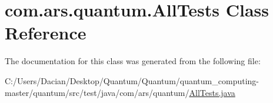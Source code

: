 \hypertarget{classcom_1_1ars_1_1quantum_1_1_all_tests}{}\section{com.\+ars.\+quantum.\+All\+Tests Class Reference}
\label{classcom_1_1ars_1_1quantum_1_1_all_tests}


The documentation for this class was generated from the following file\+:\begin{DoxyCompactItemize}
\item 
C\+:/\+Users/\+Dacian/\+Desktop/\+Quantum/\+Quantum/quantum\+\_\+computing-\/master/quantum/src/test/java/com/ars/quantum/\hyperlink{_all_tests_8java}{All\+Tests.\+java}\end{DoxyCompactItemize}
